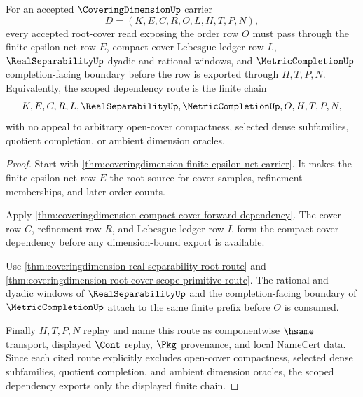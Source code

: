 \begin{theorem}
\label{thm:covering-dimension-root-cover-scoped-dependency}
For an accepted $\CoveringDimensionUp$ carrier
$$
D=(K,E,C,R,O,L,H,T,P,N),
$$
every accepted root-cover read exposing the order row $O$ must pass through the finite epsilon-net row $E$, compact-cover Lebesgue ledger row $L$, $\RealSeparabilityUp$ dyadic and rational windows, and $\MetricCompletionUp$ completion-facing boundary before the row is exported through $H,T,P,N$. Equivalently, the scoped dependency route is the finite chain
$$
K,E,C,R,L,\RealSeparabilityUp,\MetricCompletionUp,O,H,T,P,N,
$$
with no appeal to arbitrary open-cover compactness, selected dense subfamilies, quotient completion, or ambient dimension oracles.
\end{theorem}
\begin{proof}
Start with \autoref{thm:coveringdimension-finite-epsilon-net-carrier}. It makes the finite epsilon-net row $E$ the root source for cover samples, refinement memberships, and later order counts.

Apply \autoref{thm:coveringdimension-compact-cover-forward-dependency}. The cover row $C$, refinement row $R$, and Lebesgue-ledger row $L$ form the compact-cover dependency before any dimension-bound export is available.

Use \autoref{thm:coveringdimension-real-separability-root-route} and \autoref{thm:coveringdimension-root-cover-scope-primitive-route}. The rational and dyadic windows of $\RealSeparabilityUp$ and the completion-facing boundary of $\MetricCompletionUp$ attach to the same finite prefix before $O$ is consumed.

Finally $H,T,P,N$ replay and name this route as componentwise $\hsame$ transport, displayed $\Cont$ replay, $\Pkg$ provenance, and local NameCert data. Since each cited route explicitly excludes open-cover compactness, selected dense subfamilies, quotient completion, and ambient dimension oracles, the scoped dependency exports only the displayed finite chain.
\end{proof}


